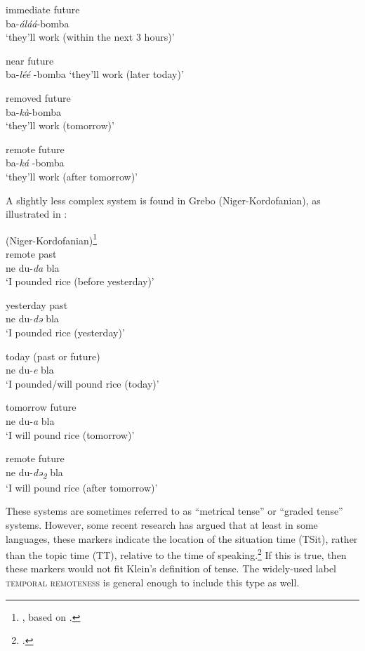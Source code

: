 \ex immediate future   \\
 ba-\textit{áláá}-bomba \\  
\glt‘they’ll work (within the next 3 hours)’

\ex near future  \\
  ba-\textit{léé} -bomba   
\glt‘they’ll work (later today)’

\ex  removed future  \\
 ba-\textit{kà}-bomba  \\ 
\glt‘they’ll work (tomorrow)’

\ex  remote future   \\
ba-\textit{ká} -bomba   \\
\glt ‘they’ll work (after tomorrow)’
\z
\z

A slightly less complex system is found in Grebo (Niger-Kordofanian), as illustrated in :

\ea \label{ex:21.38} 
{ (Niger-Kordofanian)}\footnote{\citet[365–367]{Frawley1992}, based on \citet{Innes1966}.} \\
\ea  remote past \\
ne du-\textit{da} bla \\ 
\glt‘I pounded rice (before yesterday)’

\ex yesterday past\\
ne du-\textit{də} bla\\
\glt ‘I pounded rice (yesterday)’ 

\ex today (past or future) \\
ne du-\textit{e} bla \\ 
\glt‘I pounded/will pound rice (today)’

\ex tomorrow future \\
ne du-\textit{a} bla \\
\glt‘I will pound rice (tomorrow)’

\ex remote future \\
ne du-\textit{də\textsubscript{2}} bla \\ 
\glt‘I will pound rice (after tomorrow)’
\z
\z

These systems are sometimes referred to as “metrical tense” or “graded tense” systems. However, some recent research has argued that at least in some languages, these markers indicate the location of the situation time (TSit), rather than the topic time (TT), relative to the time of speaking.\footnote{\citet{Cable2013,LaCross2016}.} If this is true, then these markers would not fit Klein’s definition of tense. The widely-used label \textsc{temporal remoteness} is general enough to include this type as well.



